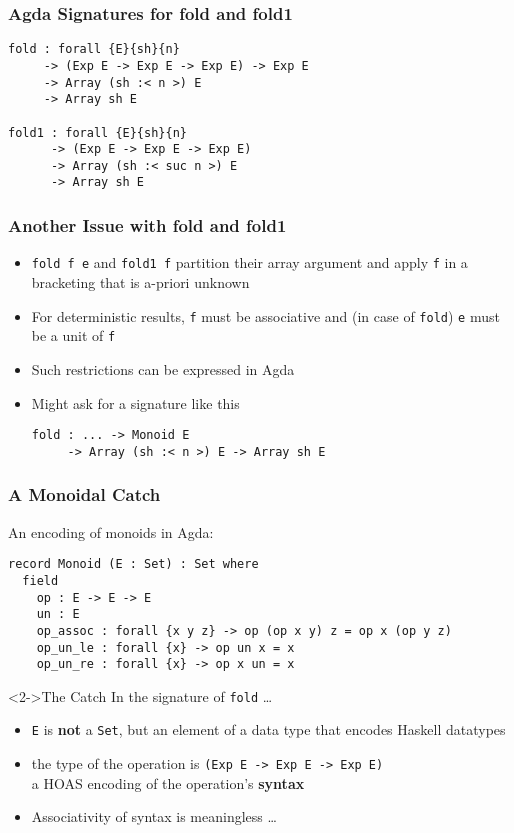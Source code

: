 \documentclass{beamer}
\begin{document}
\begin{frame}[fragile]
  \frametitle{Agda Signatures for fold and fold1}
\begin{verbatim}
fold : forall {E}{sh}{n}
     -> (Exp E -> Exp E -> Exp E) -> Exp E
     -> Array (sh :< n >) E 
     -> Array sh E

fold1 : forall {E}{sh}{n}
      -> (Exp E -> Exp E -> Exp E)
      -> Array (sh :< suc n >) E
      -> Array sh E
\end{verbatim}
\end{frame}
\begin{frame}[fragile]
  \frametitle{Another Issue with fold and fold1}
  \begin{itemize}
  \item \texttt{fold f e} and \texttt{fold1 f}  partition their array
    argument and apply \texttt{f} in a bracketing that is a-priori unknown
  \item For deterministic results, \texttt{f} must be associative and
    (in case of \texttt{fold}) \texttt{e} must be a unit of \texttt{f}
  \item<2-> Such restrictions can be expressed in Agda
  \item<3-> Might ask for a signature like this
\begin{verbatim}
fold : ... -> Monoid E
     -> Array (sh :< n >) E -> Array sh E
\end{verbatim}
  \end{itemize}
\end{frame}
\begin{frame}[fragile]
  \frametitle{A Monoidal Catch}
An encoding of monoids in Agda:\scriptsize
\begin{verbatim}
record Monoid (E : Set) : Set where
  field
    op : E -> E -> E
    un : E
    op_assoc : forall {x y z} -> op (op x y) z = op x (op y z)
    op_un_le : forall {x} -> op un x = x
    op_un_re : forall {x} -> op x un = x
\end{verbatim}
\normalsize
\begin{block}<2->{The Catch}
  In the signature of \texttt{fold} \dots
  \begin{itemize}
  \item \texttt{E} is \textbf{not} a \texttt{Set}, but an element of a
    data type that encodes Haskell datatypes
  \item the type of the operation is
    \texttt{(Exp E -> Exp E -> Exp E)}\\
    a HOAS encoding of the operation's \textbf{syntax}
  \item<3-> Associativity of syntax is meaningless \dots 
  \end{itemize}
  
\end{block}
\end{frame}
\end{document}
